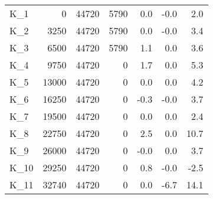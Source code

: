 \begin{tabular}{lrrrrrr}
K\_1 & 0 & 44720 & 5790 & 0.0 & -0.0 & 2.0 \\
K\_2 & 3250 & 44720 & 5790 & 0.0 & -0.0 & 3.4 \\
K\_3 & 6500 & 44720 & 5790 & 1.1 & 0.0 & 3.6 \\
K\_4 & 9750 & 44720 & 0 & 1.7 & 0.0 & 5.3 \\
K\_5 & 13000 & 44720 & 0 & 0.0 & 0.0 & 4.2 \\
K\_6 & 16250 & 44720 & 0 & -0.3 & -0.0 & 3.7 \\
K\_7 & 19500 & 44720 & 0 & 0.0 & 0.0 & 2.4 \\
K\_8 & 22750 & 44720 & 0 & 2.5 & 0.0 & 10.7 \\
K\_9 & 26000 & 44720 & 0 & -0.0 & 0.0 & 3.7 \\
K\_10 & 29250 & 44720 & 0 & 0.8 & -0.0 & -2.5 \\
K\_11 & 32740 & 44720 & 0 & 0.0 & -6.7 & 14.1 \\
\bottomrule
\end{tabular}
